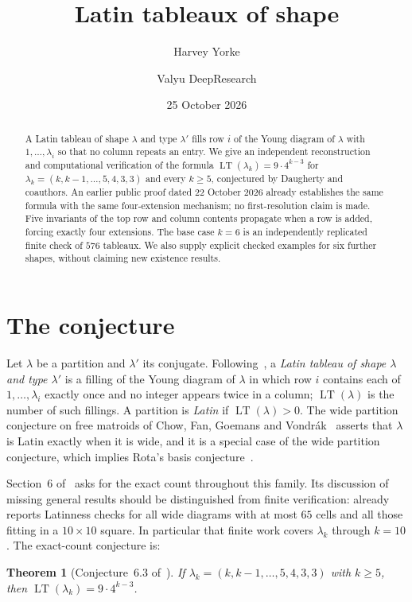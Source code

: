 \documentclass[11pt]{amsart}
\title{Latin tableaux of shape \texorpdfstring{\shapek}{(k,k-1,...,4,3,3)}}
\author{Harvey Yorke}
\author{Valyu DeepResearch}
\date{25 October 2026}
\newtheorem{theorem}{Theorem}[section]
\theoremstyle{definition}
\theoremstyle{remark}
\newcommand{\LT}{\operatorname{LT}}
\begin{document}
\raggedbottom
\begin{abstract}
A Latin tableau of shape $\lambda$ and type $\lambda'$ fills row $i$ of the Young diagram of $\lambda$ with $1,\dots,\lambda_i$ so that no column repeats an entry. We give an independent reconstruction and computational verification of the formula $\LT(\lambda_k)=9\cdot4^{k-3}$ for $\lambda_k=(k,k-1,\dots,5,4,3,3)$ and every $k\ge5$, conjectured by Daugherty and coauthors. An earlier public proof dated 22 October 2026 already establishes the same formula with the same four-extension mechanism; no first-resolution claim is made. Five invariants of the top row and column contents propagate when a row is added, forcing exactly four extensions. The base case $k=6$ is an independently replicated finite check of $576$ tableaux. We also supply explicit checked examples for six further shapes, without claiming new existence results.
\end{abstract}
\maketitle

\section{The conjecture}

Let $\lambda$ be a partition and $\lambda'$ its conjugate. Following~\cite{DFHLMP2026}, a \emph{Latin tableau of shape $\lambda$ and type $\lambda'$} is a filling of the Young diagram of $\lambda$ in which row $i$ contains each of $1,\dots,\lambda_i$ exactly once and no integer appears twice in a column; $\LT(\lambda)$ is the number of such fillings. A partition is \emph{Latin} if $\LT(\lambda)>0$. The wide partition conjecture on free matroids of Chow, Fan, Goemans and Vondr\'ak~\cite{CFGV2003} asserts that $\lambda$ is Latin exactly when it is wide, and it is a special case of the wide partition conjecture, which implies Rota's basis conjecture~\cite{DFHLMP2026}.

Section~6 of~\cite{DFHLMP2026} asks for the exact count throughout this family. Its discussion of missing general results should be distinguished from finite verification: \cite{CFGV2003} already reports Latinness checks for all wide diagrams with at most $65$ cells and all those fitting in a $10\times10$ square. In particular that finite work covers $\lambda_k$ through $k=10$. The exact-count conjecture is:

\begin{theorem}[Conjecture~6.3 of~\cite{DFHLMP2026}]\label{thm:main}
If $\lambda_k=(k,k-1,\dots,5,4,3,3)$ with $k\ge5$, then $\LT(\lambda_k)=9\cdot4^{k-3}$.
\end{theorem}
\end{document}
